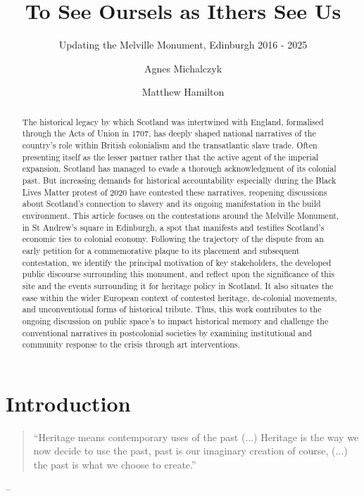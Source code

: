 \documentclass{scrartcl}
\title{To See Oursels as Ithers See Us}
\subtitle{Updating the Melville Monument, Edinburgh 2016 - 2025}
\author[1]{Agnes Michalczyk}
\author[2]{Matthew Hamilton}
\affil[1]{Freie Universität Berlin / University of Edinburgh}
\affil[2]{Università di Bologna / University of Edinburgh}
\date{}
\renewcommand{\cite}{\parencite}
\begin{document}
\maketitle

\begin{abstract}
The historical legacy by which Scotland was intertwined with England, formalised through the Acts of Union in 1707, has deeply shaped national narratives of the country's role within British colonialism and the transatlantic slave trade. Often presenting itself as the lesser partner rather that the active agent of the imperial expansion, Scotland has managed to evade a thorough acknowledgment of its colonial past. But increasing demands for historical accountability especially during the Black Lives Matter protest of 2020 have contested these narratives, reopening discussions about Scotland's connection to slavery and its ongoing manifestation in the build environment. This article focuses on the contestations around the Melville Monument, in St Andrew's square in Edinburgh, a spot that manifests and testifies Scotland's economic ties to colonial economy. Following the trajectory of the dispute from an early petition for a commemorative plaque to its placement and subsequent contestation, we identify the principal motivation of key stakeholders, the developed public discourse surrounding this monument, and reflect upon the significance of this site and the events surrounding it for heritage policy in Scotland. It also situates the ease within the wider European context of contested heritage, de-colonial movements, and unconventional forms of historical tribute. Thus, this work contributes to the ongoing discussion on public space's to impact historical memory and challenge the conventional narratives in postcolonial societies by examining institutional and community response to the crisis through art interventions. 
\end{abstract}

\clearpage

\section{Introduction}

\begin{quotation}
``Heritage means contemporary uses of the past (...) Heritage is the way we now decide to use the past, past is our imaginary creation of course,  (...) the past is what we choose to create.''
\end{quotation}
\begin{flushright}
-- \cite{gregory_ashworth_interview_2008}
\end{flushright}
\end{document}
